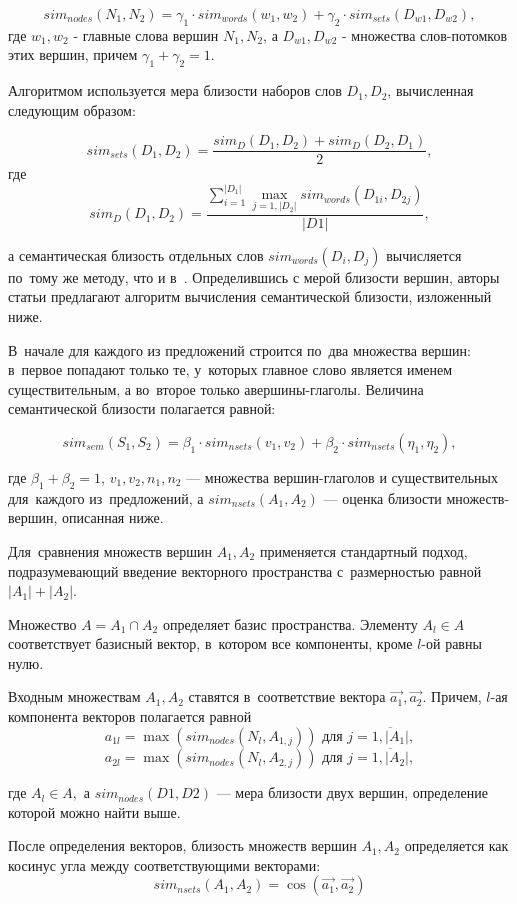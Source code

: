$$ sim_{nodes}(N_1, N_2) = \gamma_1 \cdot sim_{words}(w_1,w_2) + \gamma_2 \cdot sim_{sets}(D_{w1}, D_{w2}), $$
где $w_1, w_2$ - главные слова вершин $N_1, N_2$, а $D_{w1}, D_{w2}$ - множества слов-потомков этих вершин,
причем $\gamma_1+\gamma_2=1$.

Алгоритмом используется мера близости наборов слов $D_1,D_2$, вычисленная следующим образом:

$$sim_{sets}(D_1, D_2) = \frac{sim_{D}(D_1,D_2) + sim_{D}(D_2, D_1)}{2}, $$
где 
$$sim_{D}(D_1, D_2) = \frac{ \sum \limits_{i=1}^{|D_1|} \max_{j=1,|D_2|} sim_{words}(D_{1i}, D_{2j}) } { |D1| },$$

а семантическая близость отдельных слов $sim_{words}(D_i, D_j)$ вычисляется по~тому же методу, что и в~\cite{wordnetSim}.
Определившись с мерой близости вершин, авторы статьи предлагают 
алгоритм вычисления семантической близости, изложенный ниже.

В~начале для каждого из предложений строится по~два множества вершин:
в~первое попадают только те, у~которых главное слово является именем существительным,
а во~второе только авершины-глаголы.
Величина семантической близости полагается равной:

$$sim_{sem}(S_1 , S_2) = \beta_1 \cdot sim_{nsets}(v_1, v_2) + \beta_2 \cdot sim_{nsets}(\eta_1, \eta_2), $$

где 
$\beta_1 + \beta_2 = 1$, 
$v_1, v_2, n_1, n_2$ --- множества вершин-глаголов и существительных для~каждого из~предложений,
а $sim_{nsets}(A_1,A_2)$ --- оценка близости множеств-вершин, описанная ниже.

Для~сравнения множеств вершин $A_1,A_2$ применяется стандартный подход,
подразумевающий введение векторного пространства с~размерностью равной $|A_1|+|A_2|$.

Множество $ A = A_1 \cap A_2 $ определяет базис пространства.
Элементу $A_l \in A $ соответствует базисный вектор, в~котором
все компоненты, кроме $l$-ой равны нулю.

Входным множествам $A_1,A_2$ ставятся в~соответствие вектора $\vec{a_1},\vec{a_2}$.
Причем, $l$-ая компонента векторов полагается равной 
$$a_{1l} = \max(sim_{nodes}(N_l, A_{1,j})) \text{ для } j=\overline{1,|A_1|},$$
$$a_{2l} = \max(sim_{nodes}(N_l, A_{2,j})) \text{ для } j=\overline{1,|A_2|},$$

где $A_l \in A, $
а $sim_{nodes}(D1,D2)$ --- мера близости двух вершин, определение которой можно найти выше.

После определения векторов, близость множеств вершин $A_1,A_2$ определяется как 
косинус угла между соответствующими векторами:
$$ sim_{nsets}(A_1,A_2) = \cos\left(\vec{a_1},\vec{a_2}\right) $$


